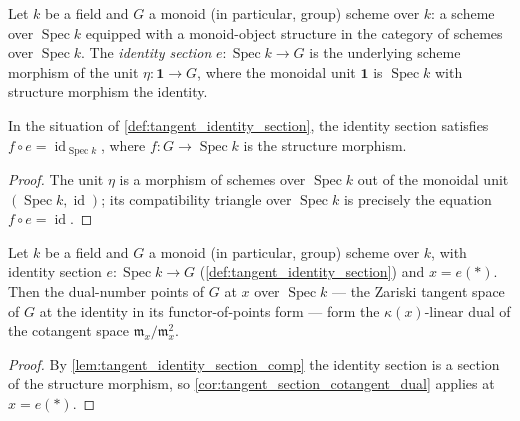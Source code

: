 \begin{definition}\leanok
  \label{def:tangent_identity_section}
  Let \(k\) be a field and \(G\) a monoid (in particular, group)
  scheme over \(k\): a scheme over \(\operatorname{Spec} k\) equipped
  with a monoid-object structure in the category of schemes over
  \(\operatorname{Spec} k\). The \emph{identity section}
  \(e : \operatorname{Spec} k \to G\) is the underlying scheme
  morphism of the unit \(\eta : \mathbf 1 \to G\), where the monoidal
  unit \(\mathbf 1\) is \(\operatorname{Spec} k\) with structure
  morphism the identity.
\end{definition}

\begin{lemma}\leanok
  \label{lem:tangent_identity_section_comp}
  In the situation of \cref{def:tangent_identity_section}, the
  identity section satisfies
  \(f \circ e = \operatorname{id}_{\operatorname{Spec} k}\), where
  \(f : G \to \operatorname{Spec} k\) is the structure morphism.
\end{lemma}

\begin{proof}\leanok
  The unit \(\eta\) is a morphism of schemes over
  \(\operatorname{Spec} k\) out of the monoidal unit
  \((\operatorname{Spec} k, \operatorname{id})\); its compatibility
  triangle over \(\operatorname{Spec} k\) is precisely the equation
  \(f \circ e = \operatorname{id}\).
\end{proof}

\begin{theorem}\leanok
  \label{thm:tangent_identity_cotangent_dual}
  Let \(k\) be a field and \(G\) a monoid (in particular, group)
  scheme over \(k\), with identity section
  \(e : \operatorname{Spec} k \to G\)
  (\cref{def:tangent_identity_section}) and \(x = e(*)\). Then the
  dual-number points of \(G\) at \(x\) over \(\operatorname{Spec} k\)
  — the Zariski tangent space of \(G\) at the identity in its
  functor-of-points form — form the \(\kappa(x)\)-linear dual of the
  cotangent space \(\mathfrak m_x/\mathfrak m_x^2\).
\end{theorem}

\begin{proof}\leanok
  By \cref{lem:tangent_identity_section_comp} the identity section is
  a section of the structure morphism, so
  \cref{cor:tangent_section_cotangent_dual} applies at \(x = e(*)\).
\end{proof}

